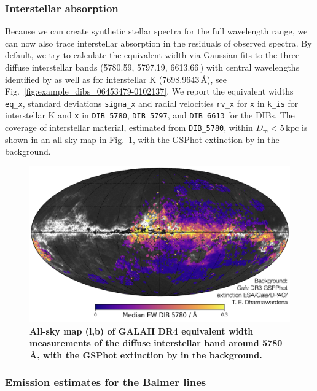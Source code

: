 \documentclass[
  journal=pasa,
  manuscript=research-paper, %
  year=2024,
  volume=37
]{cup-journal}
\newcommand{\Angstroem}{\,\text{\AA}}	%
\begin{document}
\subsubsection{Interstellar absorption}

Because we can create synthetic stellar spectra for the full wavelength range, we can now also trace interstellar absorption in the residuals of observed spectra. By default, we try to calculate the equivalent width via Gaussian fits to the three diffuse interstellar bands (5780.59, 5797.19, 6613.66\Angstroem) with central wavelengths identified by \citet{Vogrincic2023} as well as for interstellar K ($7698.9643\,\text{\AA}$), see Fig.~\ref{fig:example_dibs_06453479-0102137}. We report the equivalent widths \texttt{eq\_x}, standard deviations \texttt{sigma\_x} and radial velocities \texttt{rv\_x} for \texttt{x} in \texttt{k\_is} for interstellar K and \texttt{x} in \texttt{DIB\_5780}, \texttt{DIB\_5797}, and \texttt{DIB\_6613} for the DIBs. The coverage of interstellar material, estimated from \texttt{DIB\_5780}, within $D_\varpi < 5\,\mathrm{kpc}$ is shown in an all-sky map in Fig.~\ref{fig:galah_dr4_dibs_gaia_dr3_extinction}, with the GSPhot extinction by \citet{Andrae2023} in the background.

\begin{figure}[ht]
 \centering
 \includegraphics[width=\textwidth]{figures/galah_dr4_dibs_gaia_dr3_extinction.png}
 \caption{\textbf{All-sky map (l,b) of GALAH DR4 equivalent width measurements of the diffuse interstellar band around 5780\,\AA, with the GSPhot extinction by \citet{Andrae2023} in the background.}}
 \label{fig:galah_dr4_dibs_gaia_dr3_extinction}
\end{figure}

\subsubsection{Emission estimates for the Balmer lines} \label{sec:emission}
\end{document}
